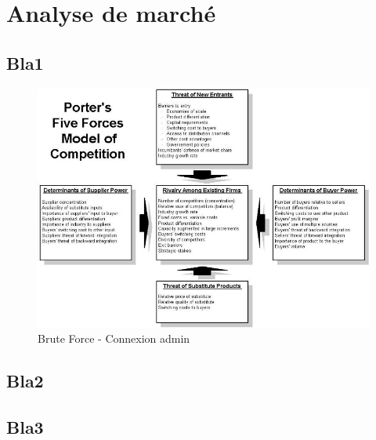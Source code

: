 
\section{Analyse de marché}

\subsection{Bla1}

\begin{figure}[H]
\begin{center}


\includegraphics[scale=0.48]{images/porter/porter_1}

\caption{Brute Force - Connexion admin}
\label{inclusion}
\end{center}
\end{figure}


\subsection{Bla2}





\subsection{Bla3}

